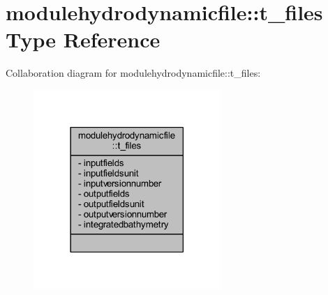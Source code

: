\hypertarget{structmodulehydrodynamicfile_1_1t__files}{}\section{modulehydrodynamicfile\+:\+:t\+\_\+files Type Reference}
\label{structmodulehydrodynamicfile_1_1t__files}


Collaboration diagram for modulehydrodynamicfile\+:\+:t\+\_\+files\+:\nopagebreak
\begin{figure}[H]
\begin{center}
\leavevmode
\includegraphics[width=201pt]{structmodulehydrodynamicfile_1_1t__files__coll__graph}
\end{center}
\end{figure}
